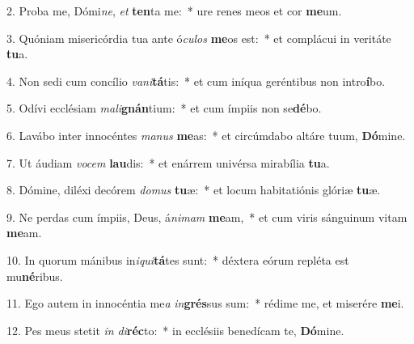 2. Proba me, Dómi\textit{ne}, \textit{et} \textbf{ten}ta me:~*  ure renes meos et cor \textbf{me}um.\

3. Quóniam misericórdia tua ante ó\textit{cu}\textit{los} \textbf{me}os est:~*  et complácui in veritáte \textbf{tu}a.\

4. Non sedi cum concílio \textit{va}\textit{ni}\textbf{tá}tis:~*  et cum iníqua geréntibus non intro\textbf{í}bo.\

5. Odívi ecclésiam \textit{ma}\textit{li}\textbf{gnán}tium:~*  et cum ímpiis non se\textbf{dé}bo.\

6. Lavábo inter innocéntes \textit{ma}\textit{nus} \textbf{me}as:~*  et circúmdabo altáre tuum, \textbf{Dó}mine.\

7. Ut áudiam \textit{vo}\textit{cem} \textbf{lau}dis:~*  et enárrem univérsa mirabília \textbf{tu}a.\

8. Dómine, diléxi decórem \textit{do}\textit{mus} \textbf{tu}æ:~*  et locum habitatiónis glóriæ \textbf{tu}æ.\

9. Ne perdas cum ímpiis, Deus, á\textit{ni}\textit{mam} \textbf{me}am,~*  et cum viris sánguinum vitam \textbf{me}am.\

10. In quorum mánibus in\textit{i}\textit{qui}\textbf{tá}tes sunt:~*  déxtera eórum repléta est mu\textbf{né}ribus.\

11. Ego autem in innocéntia me\textit{a} \textit{in}\textbf{grés}sus sum:~*  rédime me, et miserére \textbf{me}i.\

12. Pes meus stetit \textit{in} \textit{di}\textbf{réc}to:~*  in ecclésiis benedícam te, \textbf{Dó}mine.\

